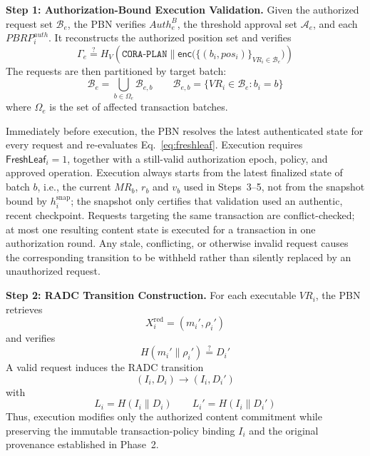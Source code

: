 \documentclass[lettersize,journal]{IEEEtran}
\begin{document}
\medskip
\noindent\textbf{Step 1: Authorization-Bound Execution Validation.}
Given the authorized request set $\mathcal{B}_e$, the PBN verifies
$Auth_e^B$, the threshold approval set $\mathcal{A}_e$, and each
$PBRP_i^{auth}$. It reconstructs the authorized position set and verifies
\begin{equation}
\Gamma_e
\stackrel{?}{=}
H_V\!\left(
\texttt{CORA-PLAN}\parallel
\mathsf{enc}\big(\{(b_i,pos_i)\}_{VR_i\in\mathcal{B}_e}\big)
\right)
\end{equation}
The requests are then partitioned by target batch:
\begin{equation}
\mathcal{B}_e
=
\bigcup_{b\in\Omega_e}\mathcal{B}_{e,b}
\qquad
\mathcal{B}_{e,b}
=
\{VR_i\in\mathcal{B}_e:b_i=b\}
\end{equation}
where $\Omega_e$ is the set of affected transaction batches.

Immediately before execution, the PBN resolves the latest authenticated
state for every request and re-evaluates
Eq.~\eqref{eq:freshleaf}.
Execution requires
$\mathsf{FreshLeaf}_i=1$,
together with a still-valid authorization epoch, policy, and approved
operation. Execution always starts from the latest
finalized state of batch $b$, i.e., the current $MR_b$, $r_b$ and $v_b$
used in Steps~3--5, not from the snapshot bound by $h_i^{\mathrm{snap}}$;
the snapshot only certifies that validation used an authentic, recent
checkpoint. Requests targeting the same transaction are conflict-checked;
at most one resulting content state is executed for a transaction in
one authorization round. Any stale, conflicting, or otherwise invalid
request causes the corresponding transition to be withheld rather than
silently replaced by an unauthorized request.

\medskip
\noindent\textbf{Step 2: RADC Transition Construction.}
For each executable $VR_i$, the PBN retrieves
\begin{equation}
X_i^{\mathrm{red}}=(m_i',\rho_i')
\end{equation}
and verifies
\begin{equation}
H(m_i'\parallel\rho_i')
\stackrel{?}{=}D_i'
\end{equation}
A valid request induces the RADC transition
\begin{equation}
(I_i,D_i)\longrightarrow(I_i,D_i')
\end{equation}
with
\begin{equation}
L_i=H(I_i\parallel D_i)
\qquad
L_i'=H(I_i\parallel D_i')
\end{equation}
Thus, execution modifies only the authorized content commitment while
preserving the immutable transaction-policy binding $I_i$ and the
original provenance established in Phase~2.
\end{document}
